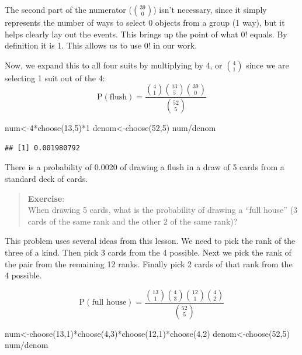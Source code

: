 \documentclass[
]{book}
\newenvironment{Shaded}{\begin{snugshade}}{\end{snugshade}}
\newcommand{\DecValTok}[1]{\textcolor[rgb]{0.00,0.00,0.81}{#1}}
\newcommand{\FunctionTok}[1]{\textcolor[rgb]{0.00,0.00,0.00}{#1}}
\newcommand{\NormalTok}[1]{#1}
\newcommand{\OtherTok}[1]{\textcolor[rgb]{0.56,0.35,0.01}{#1}}
\newcommand{\SpecialCharTok}[1]{\textcolor[rgb]{0.00,0.00,0.00}{#1}}
\begin{document}
The second part of the numerator (\(\binom{39}{0}\)) isn't necessary, since it simply represents the number of ways to select 0 objects from a group (1 way), but it helps clearly lay out the events. This brings up the point of what \(0!\) equals. By definition it is 1. This allows us to use \(0!\) in our work.

Now, we expand this to all four suits by multiplying by 4, or \(\binom{4}{1}\) since we are selecting 1 suit out of the 4:
\[
\mbox{P}(\mbox{flush})=\frac{\binom{4}{1}\binom{13}{5}\binom{39}{0}}{\binom{52}{5}}
\]

\begin{Shaded}
\begin{Highlighting}[]
\NormalTok{num}\OtherTok{\textless{}{-}}\DecValTok{4}\SpecialCharTok{*}\FunctionTok{choose}\NormalTok{(}\DecValTok{13}\NormalTok{,}\DecValTok{5}\NormalTok{)}\SpecialCharTok{*}\DecValTok{1}
\NormalTok{denom}\OtherTok{\textless{}{-}}\FunctionTok{choose}\NormalTok{(}\DecValTok{52}\NormalTok{,}\DecValTok{5}\NormalTok{)}
\NormalTok{num}\SpecialCharTok{/}\NormalTok{denom}
\end{Highlighting}
\end{Shaded}

\begin{verbatim}
## [1] 0.001980792
\end{verbatim}

There is a probability of 0.0020 of drawing a flush in a draw of 5 cards from a standard deck of cards.

\begin{quote}
\textbf{Exercise}:\\
When drawing 5 cards, what is the probability of drawing a ``full house'' (3 cards of the same rank and the other 2 of the same rank)?
\end{quote}

This problem uses several ideas from this lesson. We need to pick the rank of the three of a kind. Then pick 3 cards from the 4 possible. Next we pick the rank of the pair from the remaining 12 ranks. Finally pick 2 cards of that rank from the 4 possible.

\[
\mbox{P}(\mbox{full house})=\frac{\binom{13}{1}\binom{4}{3}\binom{12}{1}\binom{4}{2}}{\binom{52}{5}}
\]

\begin{Shaded}
\begin{Highlighting}[]
\NormalTok{num}\OtherTok{\textless{}{-}}\FunctionTok{choose}\NormalTok{(}\DecValTok{13}\NormalTok{,}\DecValTok{1}\NormalTok{)}\SpecialCharTok{*}\FunctionTok{choose}\NormalTok{(}\DecValTok{4}\NormalTok{,}\DecValTok{3}\NormalTok{)}\SpecialCharTok{*}\FunctionTok{choose}\NormalTok{(}\DecValTok{12}\NormalTok{,}\DecValTok{1}\NormalTok{)}\SpecialCharTok{*}\FunctionTok{choose}\NormalTok{(}\DecValTok{4}\NormalTok{,}\DecValTok{2}\NormalTok{)}
\NormalTok{denom}\OtherTok{\textless{}{-}}\FunctionTok{choose}\NormalTok{(}\DecValTok{52}\NormalTok{,}\DecValTok{5}\NormalTok{)}
\NormalTok{num}\SpecialCharTok{/}\NormalTok{denom}
\end{Highlighting}
\end{Shaded}
\end{document}
